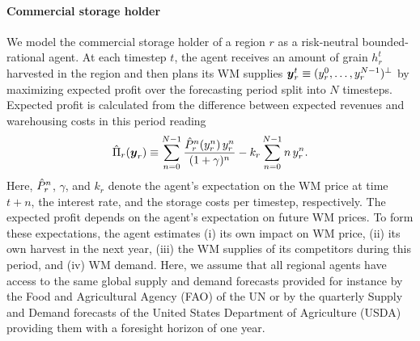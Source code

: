 \paragraph*{Commercial storage holder}
We model the commercial storage holder of a region $r$ as a risk-neutral
bounded-rational agent. At each timestep $t$, the agent receives an amount of grain $h_r^t$
harvested in the region and then plans its WM supplies
$\boldsymbol y_r^t\equiv(y_r^0,\ldots,y_r^{N-1})^{\bot}$ by maximizing expected profit over the forecasting
period split into $N$ timesteps. Expected profit is calculated from the difference between expected
revenues and warehousing costs in this period reading
\begin{equation}
  \label{eq:exp_profit} \hat{\Pi}_r(\boldsymbol y_r)\equiv
\sum_{n=0}^{N-1}\frac{\hat{P}_r^n(y_r^n)\, y_r^n}{(1+\gamma)^n} -k_r\sum_{n=0}^{N-1}
n\, y_r^n.
\end{equation}
Here, $\hat{P}_r^n$, $\gamma$, and $k_r$ denote the agent's expectation on the WM price at time $t+n$,
the interest rate, and the storage costs per timestep, respectively. The expected profit depends on
the agent's expectation on future WM prices. To form these expectations, the agent estimates (i) its
own impact on WM price, (ii) its own harvest in the next year, (iii) the WM supplies of its
competitors during this period, and (iv) WM demand. Here, we assume that all regional agents have
access to the same global supply and demand forecasts provided for instance by the Food and
Agricultural Agency (FAO) of the UN or by the quarterly Supply and Demand forecasts of the United
States Department of Agriculture (USDA) providing them with a foresight horizon of one year.

